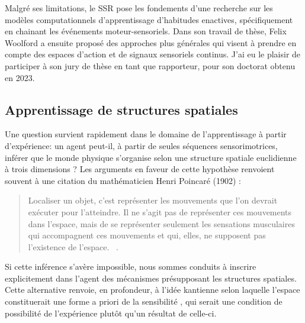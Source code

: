 Malgré ses limitations, le SSR pose les fondements d'une recherche sur les modèles computationnels d'apprentissage d'habitudes enactives, spécifiquement en chainant les événements moteur-sensoriels.
Dans son travail de thèse, Felix Woolford a ensuite proposé des approches plus générales qui visent à prendre en compte des espaces d'action et de signaux sensoriels continus. 
J’ai eu le plaisir de participer à son jury de thèse en tant que rapporteur, pour son doctorat obtenu en 2023.


\subsection{Apprentissage de structures spatiales}
\label{sec:structure_spatiale}

\noindent
Une question survient rapidement dans le domaine de l'apprentissage à partir d'expérience: un agent peut-il, à partir de seules séquences sensorimotrices, inférer que le monde physique s'organise selon une structure spatiale euclidienne à trois dimensions ?
Les arguments en faveur de cette hypothèse renvoient souvent à une citation du mathématicien Henri Poincaré (1902) :

\begin{quote}
	\og Localiser un objet, c'est représenter les mouvements que l'on devrait exécuter pour l'atteindre. 
	Il ne s’agit pas de représenter ces mouvements dans l’espace, mais de se représenter seulement les sensations musculaires qui accompagnent ces mouvements et qui, elles, ne supposent pas l’existence de l’espace. \fg\ \cite[p.~67]{poincare_science_1902}.
\end{quote}

Si cette inférence s'avère impossible, nous sommes conduits à inscrire explicitement dans l'agent des mécanismes présupposant les structures spatiales. 
Cette alternative renvoie, en profondeur,  à l'idée kantienne selon laquelle l'espace constituerait une \og forme a priori de la sensibilité \fg , qui serait une condition de possibilité de l'expérience plutôt qu'un résultat de celle-ci.

